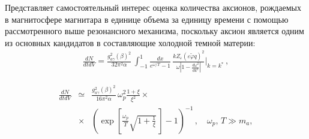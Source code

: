 %
%
%
%
%

Представляет самостоятельный интерес оценка количества аксионов,
рождаемых в магнитосфере магнитара в единице объема за единицу времени с 
помощью рассмотренного выше резонансного
механизма, поскольку аксион является одним из основных кандидатов в составляющие
холодной темной материи: 
%
\begin{eqnarray}
\frac{dN}{dt dV} =  \frac{g_{a\gamma}^2 (\beta)^2}{32 \pi^2 \alpha} \, 
\int_{-1}^1 \frac{dx}{e^{\omega/T}-1} \, 
\frac{k Z_{\varepsilon} 
(\varepsilon \tilde \varphi q)^2}{\omega 
\left |1-\frac{d\omega^2}{dk^2}\right |}\bigg |_{k=k^*}\, ,
\label{eq:Na0}
\end{eqnarray}
%

%
\begin{eqnarray}
\label{eq:Na1}
\frac{dN}{dt dV} &\simeq&  \frac{g_{a\gamma}^2 (\beta)^2}{16 \pi^2 \alpha} \,
\omega_p^2 \frac{1+\xi}{\xi^{2}}\times
\\
\nonumber 
&\times& \left (\exp{\left [\frac{\omega_p}{T} 
\sqrt{1+\frac{1}{\xi}}\, \right ]}-1 \right )^{-1} \, , \quad \omega_p,\, T \gg m_a,
\end{eqnarray}
%

